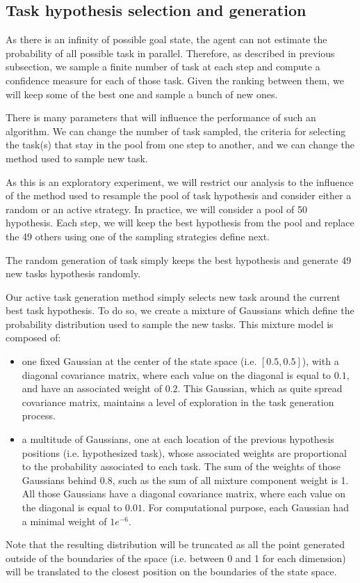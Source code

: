 \subsection{Task hypothesis selection and generation}
\label{chapter:limitations:continoushypothesis:particlefilter}

As there is an infinity of possible goal state, the agent can not estimate the probability of all possible task in parallel. Therefore, as described in previous subsection, we sample a finite number of task at each step and compute a confidence measure for each of those task. Given the ranking between them, we will keep some of the best one and sample a bunch of new ones.


There is many parameters that will influence the performance of such an algorithm. We can change the number of task sampled, the criteria for selecting the task(s) that stay in the pool from one step to another, and we can change the method used to sample new task. 

As this is an exploratory experiment, we will restrict our analysis to the influence of the method used to resample the pool of task hypothesis and consider either a random or an active strategy. In practice, we will consider a pool of 50 hypothesis. Each step, we will keep the best hypothesis from the pool and replace the 49 others using one of the sampling strategies define next.

The random generation of task simply keeps the best hypothesis and generate 49 new tasks hypothesis randomly.

Our active task generation method simply selects new task around the current best task hypothesis. To do so, we create a mixture of Gaussians which define the probability distribution used to sample the new tasks. This mixture model is composed of:
\begin{itemize}
\item  one fixed Gaussian at the center of the state space (i.e. $[0.5, 0.5]$), with a diagonal covariance matrix, where each value on the diagonal is equal to $0.1$, and have an associated weight of $0.2$. This Gaussian, which as quite spread covariance matrix, maintains a level of exploration in the task generation process.
\item a multitude of Gaussians, one at each location of the previous hypothesis positions (i.e. hypothesized task), whose associated weights are proportional to the probability associated to each task. The sum of the weights of those Gaussians behind 0.8, such as the sum of all mixture component weight is 1. All those Gaussians have a diagonal covariance matrix, where each value on the diagonal is equal to $0.01$. For computational purpose, each Gaussian had a minimal weight of $1e^{-6}$.
\end{itemize}
Note that the resulting distribution will be truncated as all the point generated outside of the boundaries of the space (i.e. between 0 and 1 for each dimension) will be translated to the closest position on the boundaries of the state space.


